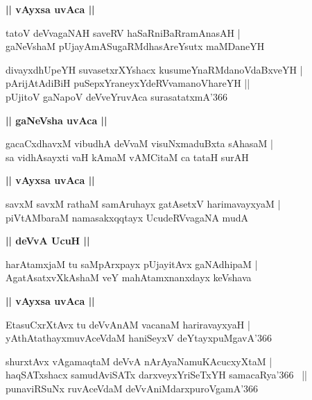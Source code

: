 \documentclass[twoside,12pt,openright]{book}
\newcounter{shloka}[chapter]
\def\uvaca#1{\centerline{{\large\textbf{#1}}}}
\begin{document}
\uvaca{|| vAyxsa uvAca ||}

\begin{shloka}%
tatoV deVvagaNAH saveRV haSaRniBaRramAnasAH |\\
gaNeVshaM pUjayAmASugaRMdhasAreYsutx maMDaneYH
\end{shloka}

\begin{shloka}%
divayxdhUpeYH suvasetxrXYshacx kusumeYnaRMdanoVdaBxveYH |\\
pArijAtAdiBiH puSepxYraneyxYdeRVvamanoVhareYH ||\\
pUjitoV gaNapoV deVveYruvAca surasatatxmA\char'366 
\end{shloka}

\uvaca{|| gaNeVsha uvAca ||}

\begin{shloka}%
gacaCxdhavxM vibudhA deVvaM visuNxmaduBxta sAhasaM |\\
sa vidhAsayxti vaH kAmaM vAMCitaM ca tataH surAH 
\end{shloka}

\uvaca{|| vAyxsa uvAca ||}

\begin{shloka}%
savxM savxM rathaM samAruhayx gatAsetxV harimavayxyaM |\\
piVtAMbaraM namasakxqqtayx UcudeRVvagaNA mudA 
\end{shloka}

\uvaca{|| deVvA UcuH ||}

\begin{shloka}%
harAtamxjaM tu saMpArxpayx pUjayitAvx gaNAdhipaM |\\
AgatAsatxvXkAshaM veY mahAtamxnanxdayx keVshava
\end{shloka}

\uvaca{|| vAyxsa uvAca ||}

\begin{shloka}%
EtasuCxrXtAvx tu deVvAnAM vacanaM hariravayxyaH |\\
yAthAtathayxmuvAceVdaM haniSeyxV deYtayxpuMgavA\char'366 
\end{shloka}

\begin{shloka}%
shurxtAvx vAgamaqtaM deVvA nArAyaNamuKAcucxyXtaM |\\
haqSATxshacx samudAviSATx darxveyxYriSeTxYH samacaRya\char'366 ~||\\
punaviRSuNx ruvAceVdaM deVvAniMdarxpuroVgamA\char'366
\end{shloka}
\end{document}
